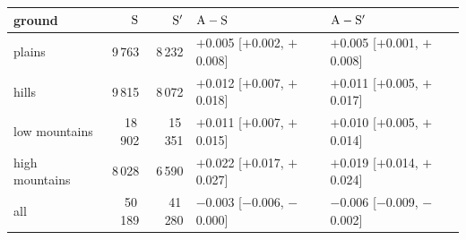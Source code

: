 \begin{tabular}{@{}l r r l l@{}}
\toprule
ground & $\mathrm{S}$ & $\mathrm{S}'$ & $\mathrm{A}-\mathrm{S}$ & $\mathrm{A}-\mathrm{S}'$ \\
\midrule
plains & 9\,763 & 8\,232 & $+$0.005 [$+$0.002, $+$0.008] & $+$0.005 [$+$0.001, $+$0.008] \\
hills & 9\,815 & 8\,072 & $+$0.012 [$+$0.007, $+$0.018] & $+$0.011 [$+$0.005, $+$0.017] \\
low mountains & 18\,902 & 15\,351 & $+$0.011 [$+$0.007, $+$0.015] & $+$0.010 [$+$0.005, $+$0.014] \\
high mountains & 8\,028 & 6\,590 & $+$0.022 [$+$0.017, $+$0.027] & $+$0.019 [$+$0.014, $+$0.024] \\
\midrule
all & 50\,189 & 41\,280 & $-$0.003 [$-$0.006, $-$0.000] & $-$0.006 [$-$0.009, $-$0.002] \\
\bottomrule
\end{tabular}
